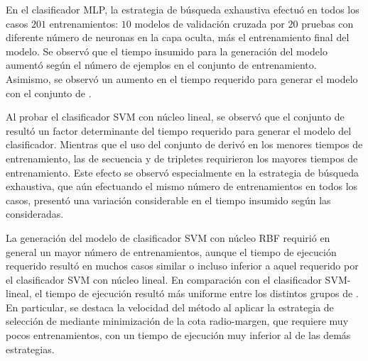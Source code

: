 
En el clasificador MLP, la estrategia de búsqueda exhaustiva efectuó
en todos los casos $201$ entrenamientos: $10$ modelos de validación
cruzada por $20$ pruebas con diferente número de neuronas en la capa
oculta, más el entrenamiento final del modelo.
Se observó que el tiempo insumido para la generación del modelo
aumentó según el número de ejemplos en el conjunto de entrenamiento.
Asimismo, se observó un aumento en el tiempo requerido para generar el
modelo con el conjunto de  .

Al probar el clasificador SVM con núcleo lineal, se observó que el
conjunto de  resultó un factor determinante del tiempo
requerido para generar el modelo del clasificador.
Mientras que el uso del conjunto de   derivó en los
menores tiempos de entrenamiento, las  de secuencia y de
tripletes requirieron los mayores tiempos de entrenamiento.
Este efecto se observó especialmente en la estrategia de búsqueda
exhaustiva, que aún efectuando el mismo número de entrenamientos en
todos los casos, presentó una variación considerable en el tiempo
insumido según las  consideradas.

La generación del modelo de clasificador SVM con núcleo RBF requirió
en general un mayor número de entrenamientos, aunque el tiempo de
ejecución requerido resultó en muchos casos similar o incluso inferior
a aquel requerido por el clasificador SVM con núcleo lineal.
En comparación con el clasificador SVM-lineal, el tiempo de ejecución
resultó más uniforme entre los distintos grupos de .
En particular, se destaca la velocidad del método al aplicar la
estrategia de selección de  mediante minimización de la cota
radio-margen, que requiere muy pocos entrenamientos, con un tiempo de
ejecución muy inferior al de las demás estrategias.
